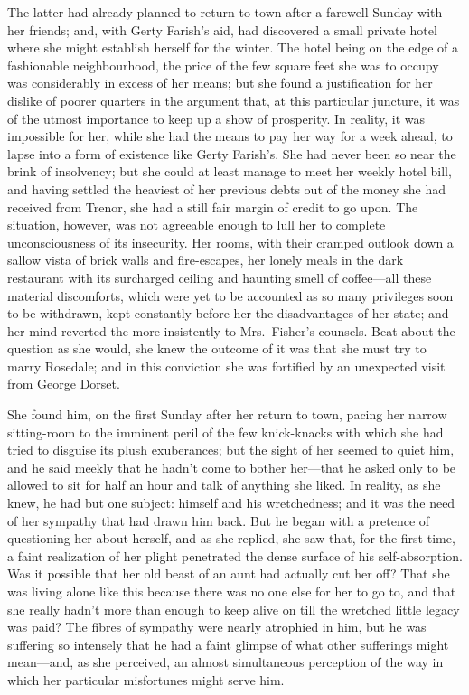\documentclass[12pt,a4paper]{book}
\begin{document}
The latter had already planned to return to town after a farewell
Sunday with her friends; and, with Gerty Farish's aid, had
discovered a small private hotel where she might establish
herself for the winter. The hotel being on the edge of a
fashionable neighbourhood, the price of the few square feet she
was to occupy was considerably in excess of her means; but she
found a justification for her dislike of poorer quarters in the
argument that, at this particular juncture, it was of the utmost
importance to keep up a show of prosperity. In reality, it was
impossible for her, while she had the means to pay her way for a
week ahead, to lapse into a form of existence like Gerty
Farish's. She had never been so near the brink of insolvency; but
she could at least manage to meet her weekly hotel bill, and
having settled the heaviest of her previous debts out of the
money she had received from Trenor, she had a still fair margin
of credit to go upon. The situation, however, was not agreeable
enough to lull her to complete unconsciousness of its insecurity. 
Her rooms, with their cramped outlook down a sallow vista of
brick walls and fire-escapes, her lonely meals in the dark
restaurant with its surcharged ceiling and haunting smell of
coffee---all these material discomforts, which were yet to be
accounted as so many privileges soon to be withdrawn, kept
constantly before her the disadvantages of her state; and
her mind reverted the more insistently to Mrs.\ Fisher's counsels. 
Beat about the question as she would, she knew the outcome of it
was that she must try to marry Rosedale; and in this conviction
she was fortified by an unexpected visit from George Dorset.





She found him, on the first Sunday after her return to town,
pacing her narrow sitting-room to the imminent peril of the few
knick-knacks with which she had tried to disguise its plush
exuberances; but the sight of her seemed to quiet him, and he
said meekly that he hadn't come to bother her---that he asked
only to be allowed to sit for half an hour and talk of anything
she liked. In reality, as she knew, he had but one subject: 
himself and his wretchedness; and it was the need of her sympathy
that had drawn him back. But he began with a pretence of
questioning her about herself, and as she replied, she saw that,
for the first time, a faint realization of her plight penetrated
the dense surface of his self-absorption. Was it possible that
her old beast of an aunt had actually cut her off? That she was
living alone like this because there was no one else for her to
go to, and that she really hadn't more than enough to keep alive
on till the wretched little legacy was paid? The fibres of
sympathy were nearly atrophied in him, but he was suffering so
intensely that he had a faint glimpse of what other sufferings
might mean---and, as she perceived, an almost simultaneous
perception of the way in which her particular misfortunes might
serve him.
\end{document}
